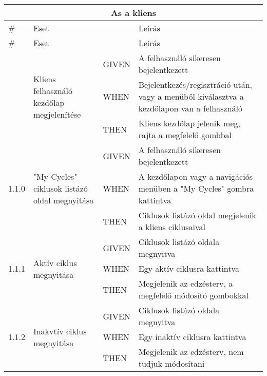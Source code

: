 \begin{center}
	\begin{longtable}{ | p{} | p{} | p{} | p{} | }
			
			\hline
			\multicolumn{4}{|c|}{\textbf{As a kliens}}
			\\ \hline
			
			\# & Eset & & Leírás
			\\ \hline \hline
			\endfirsthead %
			
			\hline
			\# & Eset & & Leírás
			\\ \hline \hline
			\endhead %
			
			\hline
			\endfoot %
			
			\endlastfoot %
			
			\multirow{3}{*}{1.0.1} 
			& \multirow{3}{=}{Kliens felhasználó kezdőlap megjelenítése} 
			& GIVEN 
			& A felhasználó sikeresen bejelentkezett \\
			\cline{3-4}
			& & WHEN 
			& Bejelentkezés/regisztráció után, vagy a menüből kiválasztva a kezdőlapon van a felhasználó \\
			\cline{3-4}
			& & THEN 
			& Kliens kezdőlap jelenik meg, rajta a megfelelő gombbal \\
			\hline

			
			\multirow{3}{*}{1.1.0} 
			& \multirow{3}{=}{"My Cycles" ciklusok listázó oldal megnyitása} 
			& GIVEN 
			& A felhasználó sikeresen bejelentkezett \\
			\cline{3-4}
			& & WHEN 
			& A kezdőlapon vagy a navigációs menüben a "My Cycles" gombra kattintva \\
			\cline{3-4}
			& & THEN 
			& Ciklusok listázó oldal megjelenik a kliens ciklusaival \\
			\hline

			\multirow{3}{*}{1.1.1} 
			& \multirow{3}{=}{Aktív ciklus megnyitása} 
			& GIVEN 
			& Ciklusok listázó oldala megnyitva \\
			\cline{3-4}
			& & WHEN 
			& Egy aktív ciklusra kattintva \\
			\cline{3-4}
			& & THEN 
			& Megjelenik az edzésterv, a megfelelő módosító gombokkal \\
			\hline

			\multirow{3}{*}{1.1.2} 
			& \multirow{3}{=}{Inakvtív ciklus megnyitása} 
			& GIVEN 
			& Ciklusok listázó oldala megnyitva \\
			\cline{3-4}
			& & WHEN 
			& Egy inaktív ciklusra kattintva \\
			\cline{3-4}
			& & THEN 
			& Megjelenik az edzésterv, nem tudjuk módosítani \\
			\hline


\end{longtable}
\end{center}
